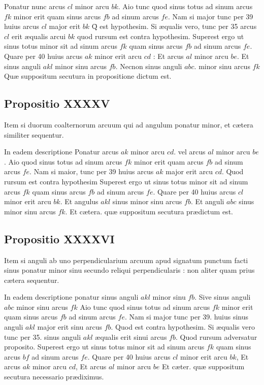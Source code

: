 \documentclass[11pt,a4paper]{article}
\begin{document}
Ponatur nunc arcus $cl$ minor arcu $bk$. Aio tunc quod sinus totus ad sinum arcus $fk$ minor erit quam sinus arcus $fb$ ad sinum arcus $fe$. Nam si major tunc per 39 huius arcus $cl$ major erit $bk$ Q̄ est hypothesim. Si æqualis  vero, tunc per 35 arcus $cl$ erit æqualis arcui $bk$ quod rursum est contra hypothesim. Superest ergo ut sinus totus minor sit ad sinum arcus $fk$ quam sinus arcus $fb$ ad sinum arcus $fe$. Quare per 40 huius arcus $ak$ minor erit arcu $cd$ : Et arcus $al$ minor arcu $be$. Et sinus anguli $akl$ minor sinu arcus $fb$. Necnon sinus anguli $abc$. minor sinu arcus $fk$ Quæ suppositum secutura in propositione dictum est.

\subsection*{Propositio XXXXV}

Item si duorum coalternorum arcuum qui ad angulum ponatur minor, et cætera similiter sequentur.

In eadem descriptione Ponatur arcus $ak$ minor arcu $cd$. vel arcus $al$ minor arcu $be$. Aio quod sinus totus ad sinum arcus $fk$ minor erit quam arcus $fb$ ad sinum arcus $fe$. Nam si maior, tunc per 39 huius arcus $ak$ major erit arcu $cd$. Quod rursum est contra hypothesim Superest ergo ut sinus totus minor sit ad sinum arcus $fk$ quam sinus arcus $fb$ ad sinum arcus $fe$. Quare per 40 huius arcus $cl$ minor erit arcu $bk$. Et angulus $akl$ sinus minor sinu arcus $fb$. Et anguli $abc$ sinus minor sinu arcus $fk$. Et cætera. quæ suppositum secutura prædictum est.

\subsection*{Propositio XXXXVI}

Item si anguli ab uno perpendicularium arcuum apud signatum punctum facti sinus ponatur minor sinu secundo reliqui perpendicularis : non aliter quam prius cætera sequentur.

In eadem descriptione ponatur sinus anguli $akl$ minor sinu $fb$. Sive sinus anguli $abc$ minor sinu arcus $fk$ Aio tunc quod sinus totus ad sinum arcus $fk$ minor erit quam sinus arcus $fb$ ad sinum arcus $fe$. Nam si major tunc per 39. huius sinus anguli $akl$ major erit sinu arcus $fb$. Quod est contra hypothesim. Si æqualis vero tunc per 35. sinus anguli $akl$ æqualis erit sinui arcus $fb$. Quod rursum adversatur proposito. Superest ergo ut sinus totus minor sit ad sinum arcus $fk$ quam sinus arcus $bf$ ad sinum arcus $fe$. Quare per 40 huius arcus $cl$ minor erit arcu $bk$, Et arcus $ak$ minor arcu $cd$, Et arcus $al$ minor arcu $be$ Et cæter. quæ suppositum secutura necessario prædiximus.
\end{document}

